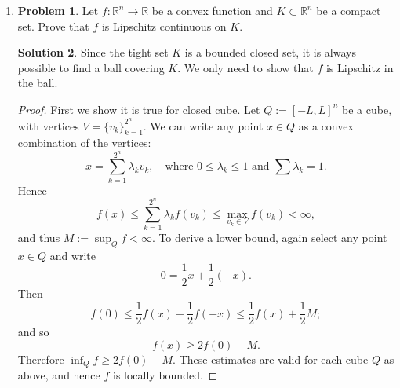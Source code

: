 \documentclass[12pt]{article}
\theoremstyle{definition}
\newtheorem*{solution}{\normalfont\textbf{Solution}}
\newtheorem*{Problem}{\noindent\textbf{Problem}}
\begin{document}
\begin{enumerate}[leftmargin=*]
\begin{solution}
\begin{proof}
                Since both possible cases lead to a contradiction, our initial assumption that there exists an unbounded level set $ \mathcal{L}(t_1) $ for some $ t_1 > t_0 $ must be false.
                Therefore, $ \mathcal{L}(t) $ is bounded for all $ t \in \mathbb{R} $.
            \end{proof}
        \end{solution}
        
    \item \begin{Problem}
            Let \( f : \mathbb{R}^n \to \mathbb{R} \) be a convex function and \( K \subset \mathbb{R}^n \) be a compact set. Prove that \( f \) is Lipschitz continuous on \( K \).
        \end{Problem}
        \begin{solution}
            Since the tight set \(K\) is a bounded closed set, it is always possible to find a ball covering \(K\). 
            We only  need to show that $f$ is Lipschitz in the ball.
            \begin{proof}
                First we show it is true for closed cube.
                Let \( Q := [-L, L]^n \) be a cube, with vertices \( V = \{v_k\}_{k=1}^{2^n} \).  
                We can write any point \( x \in Q \) as a convex combination of the vertices:  
                \[ x = \sum_{k=1}^{2^n} \lambda_k v_k, \quad \text{where } 0 \leq \lambda_k \leq 1 \text{ and } \sum \lambda_k = 1. \]  
                Hence  
                \[ f(x) \leq \sum_{k=1}^{2^n} \lambda_k f(v_k) \leq \max_{v_k \in V} f(v_k) < \infty, \]  
                and thus \( M := \sup_Q f < \infty \). To derive a lower bound, again select any point \( x \in Q \) and write  
                \[ 0 = \frac{1}{2}x + \frac{1}{2}(-x). \]  
                Then  
                \[ f(0) \leq \frac{1}{2}f(x) + \frac{1}{2}f(-x) \leq \frac{1}{2}f(x) + \frac{1}{2}M; \]  
                and so  
                \[ f(x) \geq 2f(0) - M. \]  
                Therefore \( \inf_Q f \geq 2f(0) - M \). These estimates are valid for each cube \( Q \) as above, and hence \( f \) is locally bounded.
                

\end{proof}
\end{solution}
\end{enumerate}
\end{document}
